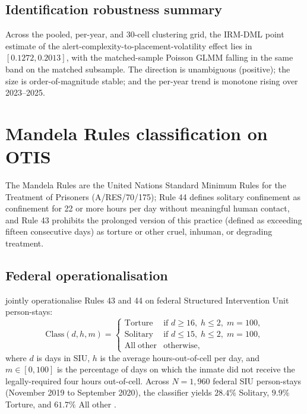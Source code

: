 \documentclass[article,shortnames,nojss]{jss}
\newcommand{\OTIS}{\textsf{OTIS}}
\begin{document}
\subsection{Identification robustness summary}
\label{sec:dml-summary}

Across the pooled, per-year, and 30-cell clustering grid, the IRM-DML
point estimate of the alert-complexity-to-placement-volatility
effect lies in $[0.1272, 0.2013]$, with the matched-sample Poisson
GLMM falling in the same band on the matched subsample. The
direction is unambiguous (positive); the size is order-of-magnitude
stable; and the per-year trend is monotone rising over 2023--2025.

\section[Mandela Rules classification on OTIS]{Mandela Rules classification on \OTIS{}}
\label{sec:mandela}

The Mandela Rules \citep{MandelaRules2015} are the United Nations
Standard Minimum Rules for the Treatment of Prisoners (A/RES/70/175);
Rule 44 defines solitary confinement as confinement for 22 or more
hours per day without meaningful human contact, and Rule 43 prohibits
the prolonged version of this practice (defined as exceeding fifteen
consecutive days) as torture or other cruel, inhuman, or degrading
treatment.

\subsection{Federal operationalisation}
\label{sec:mandela-federal}

\citet{SprottDoob2021} jointly operationalise Rules 43 and 44 on
federal Structured Intervention Unit person-stays:
\begin{equation}
\label{eq:federal-mandela}
  \mathrm{Class}(d, h, m) = \begin{cases}
    \mathrm{Torture}    & \text{if } d \ge 16,\; h \le 2,\; m = 100, \\
    \mathrm{Solitary}   & \text{if } d \le 15,\; h \le 2,\; m = 100, \\
    \mathrm{All\;other} & \text{otherwise},
  \end{cases}
\end{equation}
where $d$ is days in SIU, $h$ is the average hours-out-of-cell per
day, and $m \in [0, 100]$ is the percentage of days on which the
inmate did not receive the legally-required four hours out-of-cell.
Across $N = 1{,}960$ federal SIU person-stays (November 2019 to
September 2020), the classifier yields $28.4\%$ Solitary, $9.9\%$
Torture, and $61.7\%$ All other \citep{SprottDoob2021}.
\end{document}
